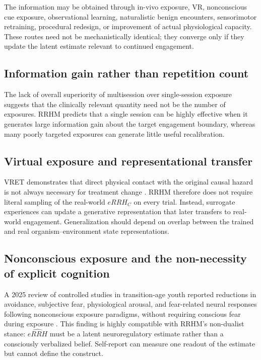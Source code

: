 \documentclass[11pt]{article}
\begin{document}
The information may be obtained through in-vivo exposure, VR, nonconscious cue exposure, observational learning, naturalistic benign encounters, sensorimotor retraining, procedural redesign, or improvement of actual physiological capacity. These routes need not be mechanistically identical; they converge only if they update the latent estimate relevant to continued engagement.

\subsection{Information gain rather than repetition count}
The lack of overall superiority of multisession over single-session exposure \cite{odgers2022} suggests that the clinically relevant quantity need not be the number of exposures. RRHM predicts that a single session can be highly effective when it generates large information gain about the target engagement boundary, whereas many poorly targeted exposures can generate little useful recalibration.

\subsection{Virtual exposure and representational transfer}
VRET demonstrates that direct physical contact with the original causal hazard is not always necessary for treatment change \cite{freitas2021,morina2015}. RRHM therefore does not require literal sampling of the real-world $eRRH_C$ on every trial. Instead, surrogate experiences can update a generative representation that later transfers to real-world engagement. Generalization should depend on overlap between the trained and real organism--environment state representations.

\subsection{Nonconscious exposure and the non-necessity of explicit cognition}
A 2025 review of controlled studies in transition-age youth reported reductions in avoidance, subjective fear, physiological arousal, and fear-related neural responses following nonconscious exposure paradigms, without requiring conscious fear during exposure \cite{siegel2025}. This finding is highly compatible with RRHM's non-dualist stance: $\widehat{eRRH}$ must be a latent neuroregulatory estimate rather than a consciously verbalized belief. Self-report can measure one readout of the estimate but cannot define the construct.
\end{document}
